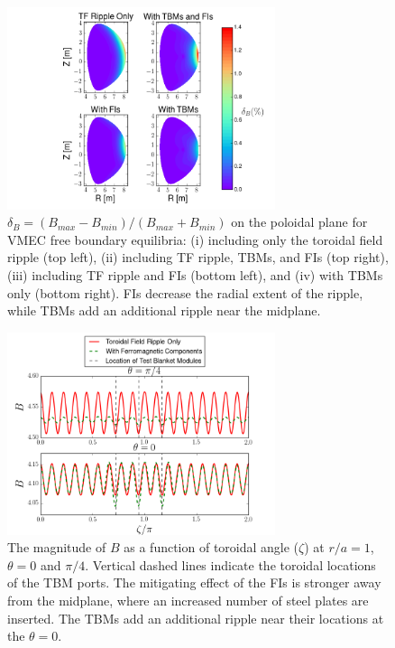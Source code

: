 \documentclass{article}
\begin{document}
\begin{figure}[h!]
\centering
\includegraphics[width=0.7\textwidth]{ripplecontour.png}
\caption{\label{fig:ripplecontour} $\delta_B = (B_{max}-B_{min})/(B_{max} + B_{min})$ on the poloidal plane for VMEC free boundary equilibria: (i) including only the toroidal field ripple (top left), (ii) including TF ripple, TBMs, and FIs (top right), (iii) including TF ripple and FIs (bottom left), and (iv) with TBMs only (bottom right). FIs decrease the radial extent of the ripple, while TBMs add an additional ripple near the midplane.}
\end{figure}

\begin{figure}[h!]
\centering
\includegraphics[width=0.7\textwidth]{toroidalripple.png}
\caption{\label{fig:toroidalripple} The magnitude of $B$ as a function of toroidal angle ($\zeta$) at $r/a = 1$, $\theta = 0$ and $\pi/4$. Vertical dashed lines indicate the toroidal locations of the TBM ports. The mitigating effect of the FIs is stronger away from the midplane, where an increased number of steel plates are inserted. The TBMs add an additional ripple near their locations at the $\theta = 0$. }
\end{figure}
\end{document}
